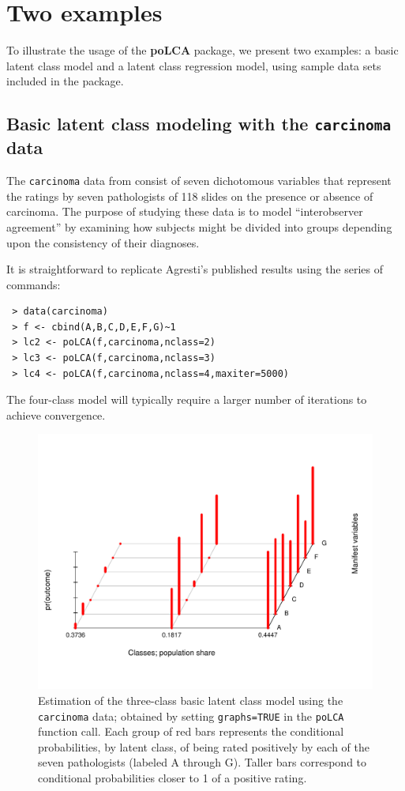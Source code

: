 \documentclass[letterpaper,12pt]{article}
\begin{document}
\section{Two examples}

To illustrate the usage of the \textbf{poLCA} package, we present two examples: a basic latent class model and a latent class regression model, using sample data sets included in the package.

\subsection{Basic latent class modeling with the \texttt{carcinoma} data}

The \texttt{carcinoma} data from \citet[542]{Agresti2002} consist of seven dichotomous variables that represent the ratings by seven pathologists of 118 slides on the presence or absence of carcinoma. The purpose of studying these data is to model ``interobserver agreement'' by examining how subjects might be divided into groups depending upon the consistency of their diagnoses.

It is straightforward to replicate Agresti's published results \citep[543]{Agresti2002} using the series of commands:
\begin{verbatim}
 > data(carcinoma)
 > f <- cbind(A,B,C,D,E,F,G)~1
 > lc2 <- poLCA(f,carcinoma,nclass=2)
 > lc3 <- poLCA(f,carcinoma,nclass=3)
 > lc4 <- poLCA(f,carcinoma,nclass=4,maxiter=5000)
\end{verbatim}
The four-class model will typically require a larger number of iterations to achieve convergence.

\begin{figure}
\centering \includegraphics[scale=0.55]{carcinoma-ex.pdf}
\vspace{-0.3in}\caption{Estimation of the three-class basic latent class model using the \texttt{carcinoma} data; obtained by setting \texttt{graphs=TRUE} in the \texttt{poLCA} function call. Each group of red bars represents the conditional probabilities, by latent class, of being rated positively by each of the seven pathologists (labeled A through G). Taller bars correspond to conditional probabilities closer to 1 of a positive rating.}
\label{f.carcinoma}
\end{figure}
\end{document}
